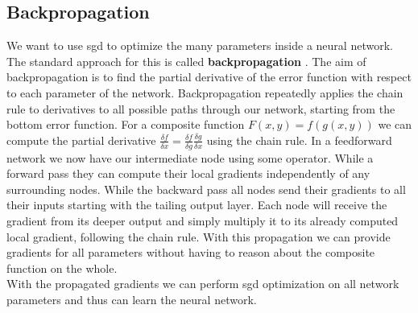 \subsection{Backpropagation}
\label{sub:concepts:nn:backprob}
We want to use \gls{sgd} to optimize the many parameters inside a neural network. The standard approach for this is called \textbf{backpropagation} \citep{rumelhart_learning_1988}. The aim of backpropagation is to find the partial derivative of the error function with respect to each parameter of the network. Backpropagation repeatedly applies the chain rule to derivatives to all possible paths through our network, starting from the bottom error function. For a composite function $F(x,y) = f(g(x, y))$ we can compute the partial derivative $\frac{\delta f}{\delta x} = \frac{\delta f}{\delta g}\frac{\delta g}{\delta x}$ using the chain rule. In a feedforward network we now have our intermediate node using some operator. While a forward pass they can compute their local gradients independently of any surrounding nodes. While the backward pass all nodes send their gradients to all their inputs starting with the tailing output layer. Each node will receive the gradient from its deeper output and simply multiply it to its already computed local gradient, following the chain rule. With this propagation we can provide gradients for all parameters without having to reason about the composite function on the whole.\\
With the propagated gradients we can perform \gls{sgd} optimization on all network parameters and thus can learn the neural network.


